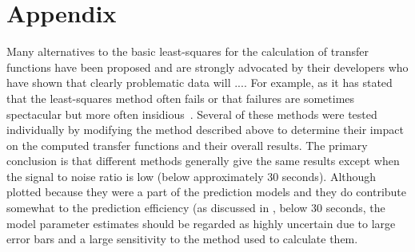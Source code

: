 \documentclass[draft,linenumbers]{agujournal2018}
\begin{document}
\clearpage

\appendix
\section{Appendix}

Many alternatives to the basic least-squares for the calculation of transfer functions have been proposed and are strongly advocated by their developers who have shown that clearly problematic data will .... For example, as it has stated that the least-squares method often fails \citep{Egbert2011} or that failures are sometimes spectacular but more often insidious~\citep{Chave1987}. Several of these methods were tested individually by modifying the method described above to determine their impact on the computed transfer functions and their overall results. The primary conclusion is that different methods generally give the same results except when the signal to noise ratio is low (below approximately $30$ seconds). Although plotted because they were a part of the prediction models and they do contribute somewhat to the prediction efficiency (as discussed in \cite{Weigel2017}, below $30$ seconds, the model parameter estimates should be regarded as highly uncertain due to large error bars and a large sensitivity to the method used to calculate them.
\end{document}
